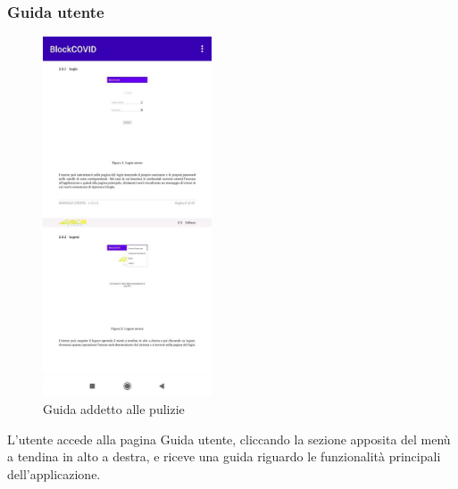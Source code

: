 	\subsubsection{Guida utente}
	\begin{figure}[H]
		\centering
		\includegraphics[width=5cm]{res/images/guidaAddetto.png}
		\caption{Guida addetto alle pulizie}
	\end{figure}
	L’utente accede alla pagina Guida utente, cliccando la sezione apposita del menù a tendina in alto a destra, e riceve una guida riguardo le funzionalità principali dell'applicazione.
	
	 
	
	

